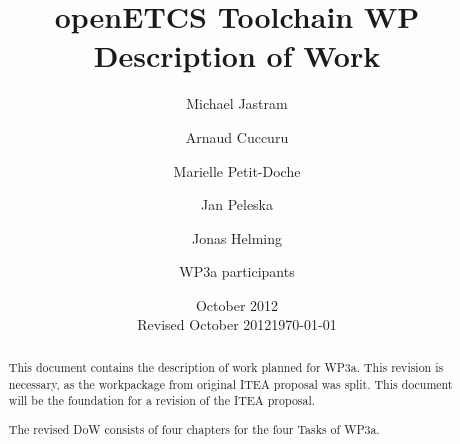 \documentclass{template/openetcs_article}
\begin{document}
\frontmatter
{}




\title{openETCS Toolchain WP Description of Work}


\date{October 2012\\Revised October 2012}
\date{\today}


\author{Michael Jastram}


\author{Arnaud Cuccuru}

  
\author{Marielle Petit-Doche}

  
\author{Jan Peleska}


\author{Jonas Helming}


\author{WP3a participants}

    



\begin{abstract}
This document contains the description of work planned for WP3a.  This revision is necessary, as the workpackage from original ITEA proposal was split.  This document will be the foundation for a revision of the ITEA proposal.

The revised DoW consists of four chapters for the four Tasks of WP3a.

\end{abstract}
\end{document}

